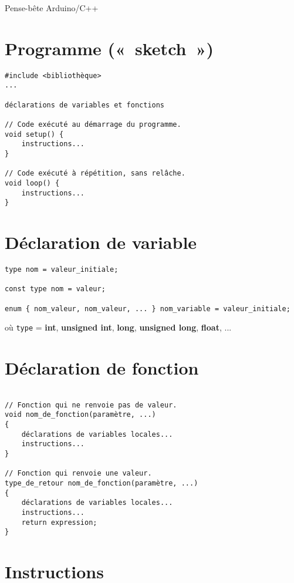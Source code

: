 \documentclass{article}
\begin{document}
\centerline{\LARGE Pense-bête Arduino/C++}
\vspace{10mm}

\section*{Programme (« sketch »)}

\begin{verbatim}
#include <bibliothèque>
...

déclarations de variables et fonctions

// Code exécuté au démarrage du programme.
void setup() {
    instructions...
}

// Code exécuté à répétition, sans relâche.
void loop() {
    instructions...
}
\end{verbatim}

\section*{Déclaration de variable}

\begin{verbatim}
type nom = valeur_initiale;

const type nom = valeur;

enum { nom_valeur, nom_valeur, ... } nom_variable = valeur_initiale;
\end{verbatim}
où
\texttt{type} = \textbf{int}, \textbf{unsigned int}, \textbf{long},
\textbf{unsigned long}, \textbf{float}, ...

\section*{Déclaration de fonction}

\begin{verbatim}

// Fonction qui ne renvoie pas de valeur.
void nom_de_fonction(paramètre, ...)
{
    déclarations de variables locales...
    instructions...
}

// Fonction qui renvoie une valeur.
type_de_retour nom_de_fonction(paramètre, ...)
{
    déclarations de variables locales...
    instructions...
    return expression;
}
\end{verbatim}

\section*{Instructions}
\end{document}
